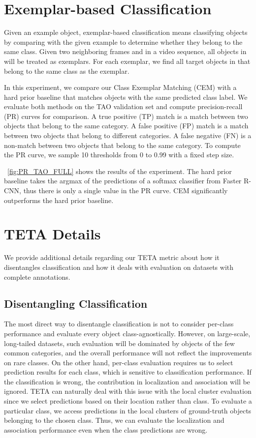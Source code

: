 \documentclass[runningheads]{llncs}
\begin{document}
\section{Exemplar-based Classification}


Given an example object, exemplar-based classification means classifying objects by comparing with the given example to determine whether they belong to the same class.
Given two neighboring frames  and  in a video sequence, all objects in  will be treated as exemplars.
For each exemplar, we find all target objects in  that belong to the same class as the exemplar.

In this experiment, we compare our Class Exemplar Matching (CEM) with a hard prior baseline that matches objects with the same predicted class label.
We evaluate both methods on the TAO validation set
and compute precision-recall (PR) curves for comparison.
A true positive (TP) match is a match between two objects that belong to the same category.
A false positive (FP) match is a match between two objects that belong to different categories.
A false negative (FN) is a non-match between two objects that belong to the same category.
To compute the PR curve, we sample 10 thresholds from 0 to 0.99 with a fixed step size.


\figurename~\ref{fig:PR_TAO_FULL} shows the results of the experiment.
The hard prior baseline takes the argmax of the predictions of a softmax classifier from Faster R-CNN, thus there is only a single value in the PR curve. CEM significantly outperforms the hard prior baseline.


\section{TETA Details}

We provide additional details regarding our TETA metric about how it disentangles classification and how it deals with evaluation on datasets with complete annotations.

\subsection{Disentangling Classification}

The most direct way to disentangle classification is not to consider per-class performance and evaluate every object class-agnostically.
However, on large-scale, long-tailed datasets, such evaluation will be dominated by objects of the few common categories,
and the overall performance will not reflect the improvements on rare classes.
On the other hand, per-class evaluation requires us to select prediction results for each class, which is sensitive to classification performance.
If the classification is wrong, the contribution in localization and association will be ignored. 
TETA can naturally deal with this issue with the local cluster evaluation since we select predictions based on their location rather than class.
To evaluate a particular class, we access predictions in the local clusters of ground-truth objects belonging to the chosen class.
Thus, we can evaluate the localization and association performance even when the class predictions are wrong.
\end{document}
